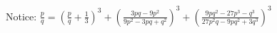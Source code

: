 \documentclass[preview]{standalone}
\begin{document}
\begin{center}
Notice: $ \frac{p}{q} = \left( \frac{p}{q} + \frac{1}{3} \right)^3 + \left( \frac{3pq - 9p^2}{9p^2 - 3pq + q^2} \right)^3 + \left( \frac{9pq^2 - 27p^3 - q^3}{27p^2q - 9pq^2 + 3q^3} \right)^3 $
\end{center}
\end{document}
